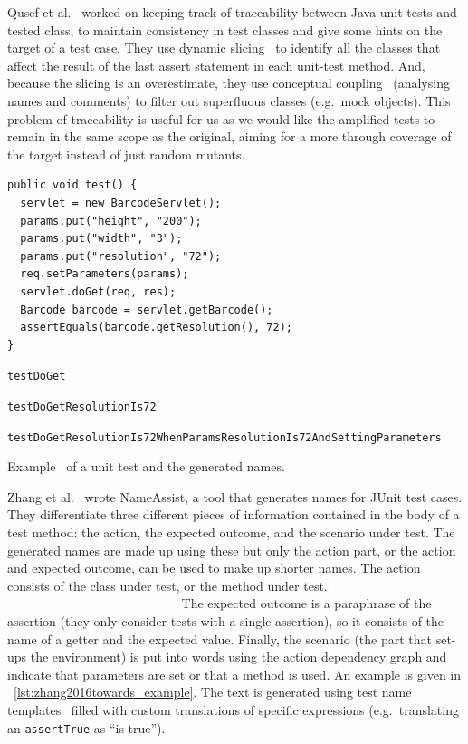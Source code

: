\documentclass[11pt]{sdm_internship}
\newcommand{\todo}[1]{\colorbox{Red!75}{\textcolor{white}{\textbf{TODO\ifx&#1&\else: #1\fi}}}}
\theoremstyle{definition}
\begin{document}
Qusef et al.~\cite{qusef2011scotch} worked on keeping track of traceability between Java unit tests and tested class, to maintain consistency in test classes and give some hints on the target of a test case.
They use dynamic slicing~\cite{korel1988dynamic} to identify all the classes that affect the result of the last assert statement in each unit-test method.
And, because the slicing is an overestimate, they use conceptual coupling~\cite{poshyvanyk2009using} (analysing names and comments) to filter out superfluous classes (e.g.\ mock objects).
This problem of traceability is useful for us as we would like the amplified tests to remain in the same scope as the original, aiming for a more through coverage of the target instead of just random mutants.

\begin{listing}[H]
  \centering
  \begin{verbatim}
public void test() {
  servlet = new BarcodeServlet();
  params.put("height", "200");
  params.put("width", "3");
  params.put("resolution", "72");
  req.setParameters(params);
  servlet.doGet(req, res);
  Barcode barcode = servlet.getBarcode();
  assertEquals(barcode.getResolution(), 72);
}
  \end{verbatim}
  \begin{description}[align=right,labelwidth=2.1cm]
    \item[small] \texttt{testDoGet}
    \item[medium] \texttt{testDoGetResolutionIs72}
    \item[full] \texttt{testDoGetResolutionIs72WhenParamsResolutionIs72AndSettingParameters}
  \end{description}
  \caption{Example~\cite{zhang2016towards} of a unit test and the generated names.}%
\label{lst:zhang2016towards_example}
\end{listing}
Zhang et al.~\cite{zhang2016towards} wrote NameAssist, a tool that generates names for JUnit test cases.
They differentiate three different pieces of information contained in the body of a test method: the action, the expected outcome, and the scenario under test.
The generated names are made up using these but only the action part, or the action and expected outcome, can be used to make up shorter names.
The action consists of the class under test, or the method under test.\todo{give more details}
The expected outcome is a paraphrase of the assertion (they only consider tests with a single assertion), so it consists of the name of a getter and the expected value.
Finally, the scenario (the part that set-ups the environment) is put into words using the action dependency graph and indicate that parameters are set or that a method is used.
An example is given in \listingname~\ref{lst:zhang2016towards_example}.
The text is generated using test name templates~\cite{zhang2015automatically} filled with custom translations of specific expressions (e.g.\ translating an \texttt{assertTrue} as ``is true'').
\end{document}
